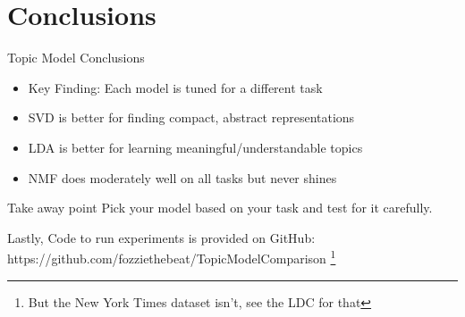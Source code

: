 \documentclass[compress]{beamer}
\begin{document}
\section{Conclusions}

\begin{frame}{Topic Model Conclusions}
\begin{itemize}
\item Key Finding: Each model is tuned for a different task
\item SVD is better for finding compact, abstract representations
\item LDA is better for learning meaningful/understandable topics
\item NMF does moderately well on all tasks but never shines
\end{itemize}

\begin{block}{Take away point}
Pick your model based on your task and test for it carefully.  
\end{block}

\pause
 Lastly, Code to run experiments is provided on GitHub:
 https://github.com/fozziethebeat/TopicModelComparison \footnote{But the New
 York Times dataset isn't, see the LDC for that}
\end{frame}
\end{document}
